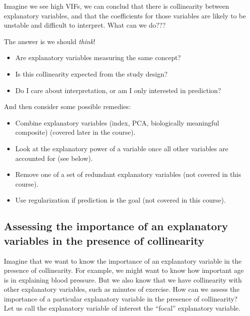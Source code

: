 \documentclass[
  letterpaper,
  8pt,
  a4paper]{book}
\providecommand{\tightlist}{%
  \setlength{\itemsep}{0pt}\setlength{\parskip}{0pt}}
\begin{document}
Imagine we see high VIFs, we can conclud that there is collinearity
between explanatory variables, and that the coefficients for those
variables are likely to be unstable and difficult to interpret. What can
we do???

The answer is we should \emph{think}!

\begin{itemize}
\tightlist
\item
  Are explanatory variables measuring the same concept?
\item
  Is this collinearity expected from the study design?
\item
  Do I care about interpretation, or am I only interested in prediction?
\end{itemize}

And then consider some possible remedies:

\begin{itemize}
\tightlist
\item
  Combine explanatory variables (index, PCA, biologically meaningful
  composite) (covered later in the course).
\item
  Look at the explanatory power of a variable once all other variables
  are accounted for (see below).
\item
  Remove one of a set of redundant explanatory variables (not covered in
  this course).
\item
  Use regularization if prediction is the goal (not covered in this
  course).
\end{itemize}

\subsection*{Assessing the importance of an explanatory variables in the
presence of
collinearity}\label{assessing-the-importance-of-an-explanatory-variables-in-the-presence-of-collinearity}

Imagine that we want to know the importance of an explanatory variable
in the presence of collinearity. For example, we might want to know how
important age is in explaining blood pressure. But we also know that we
have collinearity with other explanatory variables, such as minutes of
exercise. How can we assess the importance of a particular explanatory
variable in the presence of collinearity? Let us call the explanatory
variable of interest the ``focal'' explanatory variable.
\end{document}
